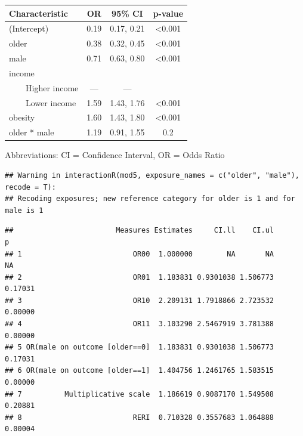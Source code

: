 \documentclass[
]{book}
\newenvironment{Shaded}{\begin{snugshade}}{\end{snugshade}}
\newcommand{\AttributeTok}[1]{\textcolor[rgb]{0.13,0.29,0.53}{#1}}
\newcommand{\FunctionTok}[1]{\textcolor[rgb]{0.13,0.29,0.53}{\textbf{#1}}}
\newcommand{\NormalTok}[1]{#1}
\newcommand{\SpecialCharTok}[1]{\textcolor[rgb]{0.81,0.36,0.00}{\textbf{#1}}}
\newcommand{\StringTok}[1]{\textcolor[rgb]{0.31,0.60,0.02}{#1}}
\begin{document}
\begin{table}[t]
\fontsize{12.0pt}{14.0pt}\selectfont
\begin{tabular*}{\linewidth}{@{\extracolsep{\fill}}lccc}
\toprule
\textbf{Characteristic} & \textbf{OR} & \textbf{95\% CI} & \textbf{p-value} \\ 
\midrule\addlinespace[2.5pt]
(Intercept) & 0.19 & 0.17, 0.21 & <0.001 \\ 
older & 0.38 & 0.32, 0.45 & <0.001 \\ 
male & 0.71 & 0.63, 0.80 & <0.001 \\ 
income &  &  &  \\ 
    Higher income & — & — &  \\ 
    Lower income & 1.59 & 1.43, 1.76 & <0.001 \\ 
obesity & 1.60 & 1.43, 1.80 & <0.001 \\ 
older * male & 1.19 & 0.91, 1.55 & 0.2 \\ 
\bottomrule
\end{tabular*}
\begin{minipage}{\linewidth}
\vspace{.05em}
Abbreviations: CI = Confidence Interval, OR = Odds Ratio\\
\end{minipage}
\end{table}

\begin{Shaded}
\end{Shaded}

\begin{verbatim}
## Warning in interactionR(mod5, exposure_names = c("older", "male"), recode = T):
## Recoding exposures; new reference category for older is 1 and for male is 1
\end{verbatim}

\begin{verbatim}
##                        Measures Estimates     CI.ll    CI.ul       p
## 1                          OR00  1.000000        NA       NA      NA
## 2                          OR01  1.183831 0.9301038 1.506773 0.17031
## 3                          OR10  2.209131 1.7918866 2.723532 0.00000
## 4                          OR11  3.103290 2.5467919 3.781388 0.00000
## 5 OR(male on outcome [older==0]  1.183831 0.9301038 1.506773 0.17031
## 6 OR(male on outcome [older==1]  1.404756 1.2461765 1.583515 0.00000
## 7          Multiplicative scale  1.186619 0.9087170 1.549508 0.20881
## 8                          RERI  0.710328 0.3557683 1.064888 0.00004
\end{verbatim}
\end{document}
